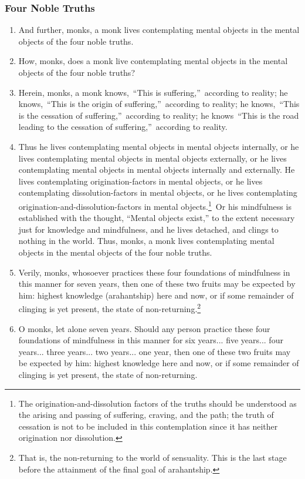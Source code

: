 \subsubsection*{Four Noble Truths}
\begin{enumerate}[resume]
\item And further, monks, a monk lives contemplating mental objects in the mental objects of the four noble truths.
\item How, monks, does a monk live contemplating mental objects in the mental objects of the four noble truths?
\item Herein, monks, a monk knows, “This is suffering,” according to reality; he knows, “This is the origin of suffering,” according to reality; he knows, “This is the cessation of suffering,” according to reality; he knows “This is the road leading to the cessation of suffering,” according to reality.
\pagebreak
\item Thus he lives contemplating mental objects in mental objects internally, or he lives contemplating mental objects in mental objects externally, or he lives contemplating mental objects in mental objects internally and externally. He lives contemplating origination-factors in mental objects, or he lives contemplating dissolution-factors in mental objects, or he lives contemplating origination-and-dissolution-factors in mental objects.\footnote{The origination-and-dissolution factors of the truths should be understood as the arising and passing of suffering, craving, and the path; the truth of cessation is not to be included in this contemplation since it has neither origination nor dissolution.} Or his mindfulness is established with the thought, “Mental objects exist,” to the extent necessary just for knowledge and mindfulness, and he lives detached, and clings to nothing in the world. Thus, monks, a monk lives contemplating mental objects in the mental objects of the four noble truths.
\item Verily, monks, whosoever practices these four foundations of mindfulness in this manner for seven years, then one of these two fruits may be expected by him: highest knowledge (arahantship) here and now, or if some remainder of clinging is yet present, the state of non-returning.\footnote{That is, the non-returning to the world of sensuality. This is the last stage before the attainment of the final goal of arahantship.}
\item O monks, let alone seven years. Should any person practice these four foundations of mindfulness in this manner for six years... five years... four years... three years... two years... one year, then one of these two fruits may be expected by him: highest knowledge here and now, or if some remainder of clinging is yet present, the state of non-returning.

\end{enumerate}
